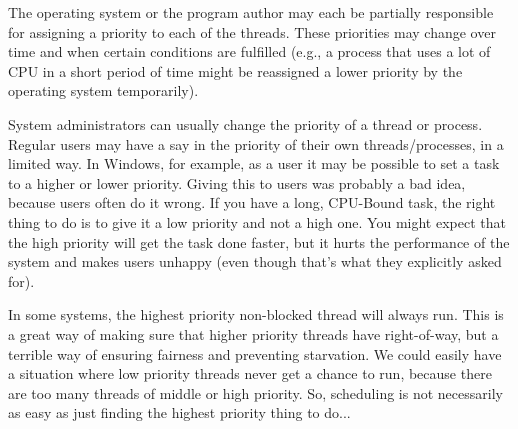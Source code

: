 The operating system or the program author may each be partially responsible for assigning a priority to each of the threads. These priorities may change over time and when certain conditions are fulfilled (e.g., a process that uses a lot of CPU in a short period of time might be reassigned a lower priority by the operating system temporarily).

System administrators can usually change the priority of a thread or process. Regular users may have a say in the priority of their own threads/processes, in a limited way. In Windows, for example, as a user it may be possible to set a task to a higher or lower priority. Giving this to users was probably a bad idea, because users often do it wrong. If you have a long, CPU-Bound task, the right thing to do is to give it a low priority and not a high one. You might expect that the high priority will get the task done faster, but it hurts the performance of the system and makes users unhappy (even though that's what they explicitly asked for).

In some systems, the highest priority non-blocked thread will always run. This is a great way of making sure that higher priority threads have right-of-way, but a terrible way of ensuring fairness and preventing starvation. We could easily have a situation where low priority threads never get a chance to run, because there are too many threads of middle or high priority. So, scheduling is not necessarily as easy as just finding the highest priority thing to do...





